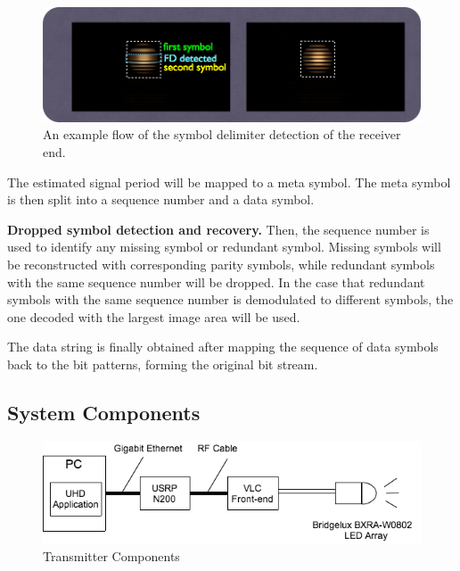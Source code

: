 \begin{figure}[!htb]
  \centering
  \includegraphics[scale=0.25]{fig/flow_rx.png} 
  \caption{An example flow of the symbol delimiter detection of the receiver end.}
  \label{fig:flow_rx}
\end{figure}

The estimated signal period will be mapped to a meta symbol. The meta symbol is then split into a sequence number and a data symbol.

\textbf{Dropped symbol detection and recovery.}
Then, the sequence number is used to identify any missing symbol or redundant symbol. Missing symbols will be reconstructed with corresponding parity symbols, while redundant symbols with the same sequence number will be dropped. In the case that redundant symbols with the same sequence number is demodulated to different symbols, the one decoded with the largest image area will be used.

The data string is finally obtained after mapping the sequence of data symbols back to the bit patterns, forming the original bit stream.

\subsection{System Components}

\begin{figure}[!htb]
  \centering
  \includegraphics[scale=0.4]{fig/tx_component.png} 
  \caption{Transmitter Components}
  \label{fig:tx_component}
\end{figure}



